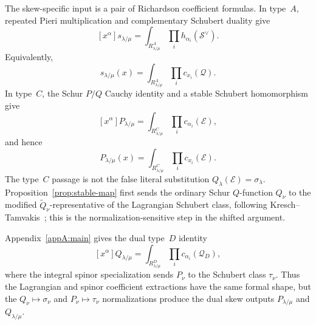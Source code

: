 \documentclass[11pt,a4paper,oneside]{amsart}
\numberwithin{equation}{section}
\theoremstyle{definition}
\theoremstyle{remark}
\newcommand{\cS}{\mathcal S}
\newcommand{\cQ}{\mathcal Q}
\newcommand{\cE}{\mathcal E}
\begin{document}
The skew-specific input is a pair of Richardson coefficient formulas.  In type~$A$, repeated Pieri multiplication and complementary Schubert duality give
\begin{equation}\label{eq:intro-A-coeff}
 [x^\alpha]s_{\lambda/\mu}
 =\int_{R^A_{\lambda/\mu}}
   \prod_i h_{\alpha_i}(\cS^\vee).
\end{equation}
Equivalently,
\begin{equation}\label{eq:intro-A-total}
 s_{\lambda/\mu}(x)
 =\int_{R^A_{\lambda/\mu}}
   \prod_i c_{x_i}(\cQ).
\end{equation}
In type~$C$, the Schur $P/Q$ Cauchy identity and a stable Schubert homomorphism give
\begin{equation}\label{eq:intro-C-coeff}
 [x^\alpha]P_{\lambda/\mu}
 =\int_{R^C_{\lambda/\mu}}
   \prod_i c_{\alpha_i}(\cE),
\end{equation}
and hence
\begin{equation}\label{eq:intro-C-total}
 P_{\lambda/\mu}(x)
 =\int_{R^C_{\lambda/\mu}}
   \prod_i c_{x_i}(\cE).
\end{equation}
The type~$C$ passage is not the false literal substitution $Q_\lambda(\cE)=\sigma_\lambda$.  Proposition~\ref{prop:stable-map} first sends the ordinary Schur $Q$-function $Q_\nu$ to the modified $\widetilde Q_\nu$-representative of the Lagrangian Schubert class, following Kresch--Tamvakis~\cite{KT03}; this is the normalization-sensitive step in the shifted argument.

Appendix~\ref{appA:main} gives the dual type~$D$ identity
\begin{equation}\label{eq:intro-D-coeff}
 [x^\alpha]Q_{\lambda/\mu}
 =\int_{R^D_{\lambda/\mu}}
   \prod_i c_{\alpha_i}(\mathcal Q_D),
\end{equation}
where the integral spinor specialization sends $P_\nu$ to the Schubert class $\tau_\nu$.  Thus the Lagrangian and spinor coefficient extractions have the same formal shape, but the $Q_\nu\mapsto\sigma_\nu$ and $P_\nu\mapsto\tau_\nu$ normalizations produce the dual skew outputs $P_{\lambda/\mu}$ and $Q_{\lambda/\mu}$.
\end{document}
